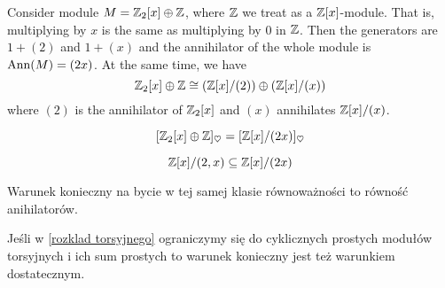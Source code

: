 \begin{example}
  Consider module $M=\operatorname{\mathbb{Z}}_2[x]\oplus \operatorname{\mathbb{Z}}$, where $\operatorname{\mathbb{Z}}$ we treat as a $\operatorname{\mathbb{Z}}[x]$-module. That is, multiplying by $x$ is the same as multiplying by $0$ in $\operatorname{\mathbb{Z}}$. Then the generators are $1+(2)$ and $1+(x)$ and the annihilator of the whole module is $\operatorname{Ann}(M)=(2x)$. At the same time, we have
  $$\operatorname{\mathbb{Z}}_2[x]\oplus\operatorname{\mathbb{Z}}\cong (\operatorname{\mathbb{Z}}[x]/(2))\oplus (\operatorname{\mathbb{Z}}[x]/(x))$$
  where $(2)$ is the annihilator of $\operatorname{\mathbb{Z}}_2[x]$ and $(x)$ annihilates $\operatorname{\mathbb{Z}}[x]/(x)$.
%
%
%

$$[\operatorname{\mathbb{Z}}_2[x]\oplus\operatorname{\mathbb{Z}}]_\heartsuit = [\operatorname{\mathbb{Z}}[x]/(2x)]_\heartsuit$$

\begin{center}\end{center}
\end{example}

$$\operatorname{\mathbb{Z}}[x]/(2, x)\subseteq \operatorname{\mathbb{Z}}[x]/(2x)$$

Warunek konieczny na bycie w tej samej klasie równoważności to równość anihilatorów.

Jeśli w \cref{rozklad torsyjnego} ograniczymy się do cyklicznych prostych modułów torsyjnych i ich sum prostych to warunek konieczny jest też warunkiem dostatecznym.
